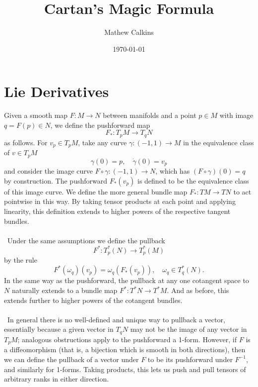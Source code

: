 \documentclass[11pt,letterpaper]{article}
\begin{document}
\title{Cartan's Magic Formula}

\author{Mathew Calkins}

\date{\today}

 
\maketitle


\tableofcontents



\section{Lie Derivatives}
Given a smooth map $F: M \to N$ between manifolds and a point $p \in M$ with image $q = F(p) \in N$, we define the pushforward map \begin{equation}
F_*: T_p M \to T_q N
\end{equation}
as follows. For $v_p \in T_p M$, take any curve $\gamma: (-1,1) \to M$ in the equivalence class of $v \in T_p M$ \begin{equation}
\gamma(0) = p, \quad \dot{\gamma}(0) = v_p
\end{equation}
and consider the image curve $F \circ \gamma: (-1,1) \to N$, which has $(F \circ \gamma)(0) = q$ by construction. The pushforward $F_*(v_p)$ is defined to be the equivalence class of this image curve. We define the more general bundle map $F_*: TM \to T N$ to act pointwise in this way. By taking tensor products at each point and applying linearity, this definition extends to higher powers of the respective tangent bundles.\\
\\
\
Under the same assumptions we define the pullback \begin{equation}
F^*: T_p^*(N) \to T_p^*(M)
\end{equation}
by the rule \begin{equation}
F^*(\omega_q)(v_p) = \omega_q(F_*(v_p)), \quad \omega_q \in T^*_q(N).
\end{equation}
In the same way as the pushforward, the pullback at any one cotangent space to $N$ naturally extends to a bundle map $F^*: T^* N \to T^* M$. And as before, this extends further to higher powers of the cotangent bundles.\\
\\
\
In general there is no well-defined and unique way to pullback a vector, essentially because a given vector in $T_q N$ may not be the image of any vector in $T_p M$; analogous obstructions apply to the pushforward a 1-form. However, if $F$ is a diffeomorphism (that is, a bijection which is smooth in both directions), then we can define the pullback of a vector under $F$ to be its pushforward under $F^{-1}$, and similarly for 1-forms. Taking products, this lets us push and pull tensors of arbitrary ranks in either direction.\\
\end{document}
